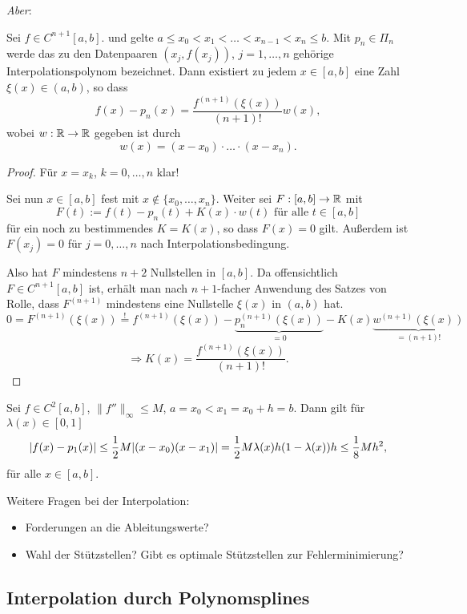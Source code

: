 \emph{Aber}:

\begin{thm}[Interpolationsfehler]
 Sei $f \in C^{n+1}[a,b]$. und gelte $a \le x_0 < x_1 < \ldots < x_{n-1} < x_n \le b$. Mit $p_n \in \Pi_n$ werde das zu den Datenpaaren $(x_j, f(x_j))$, $j=1, \ldots, n$ gehörige Interpolationspolynom bezeichnet. Dann existiert zu jedem $x \in [a,b]$ eine Zahl $\xi(x) \in (a,b)$, so dass
 \[ f(x) - p_n(x) = \frac{f^{(n+1)}(\xi(x))}{(n+1)!} w(x), \]
 wobei $w : \mathbb{R} \to \mathbb{R}$ gegeben ist durch
 \[ w(x) = (x-x_0) \cdot \ldots \cdot (x-x_n). \]
\end{thm}

\begin{proof}
 Für $x=x_k$, $k =0, \ldots, n$ klar!
 
 Sei nun $x \in [a,b]$ fest mit $x \notin \{ x_0, \ldots, x_n \}$. Weiter sei $F:[a,b] \to \mathbb{R}$ mit
 \[ F(t) := f(t) - p_n(t) + K(x) \cdot w(t) \text{ für alle } t \in [a,b] \]
 für ein noch zu bestimmendes $K = K(x)$, so dass $F(x) = 0$ gilt. Außerdem ist $F(x_j) = 0$ für $j = 0, \ldots, n$ nach Interpolationsbedingung.
 
 Also hat $F$ mindestens $n+2$ Nullstellen in $[a,b]$. Da offensichtlich $F \in C^{n+1}[a,b]$ ist, erhält man nach $n+1$-facher Anwendung des Satzes von Rolle, dass $F^{(n+1)}$ mindestens eine Nullstelle $\xi(x)$ in $(a,b)$ hat.
 \[ 0 = F^{(n+1)}(\xi(x)) \overset{!}{=} f^{(n+1)}(\xi(x)) - \underbrace{p_n^{(n+1)}(\xi(x))}_{=0} - K(x) \underbrace{w^{(n+1)}(\xi(x))}_{=(n+1)!} \]
 \[ \Rightarrow K(x) = \frac{f^{(n+1)}(\xi(x))}{(n+1)!}. \]
\end{proof}

\begin{exmp}
 Sei $f \in C^2[a,b]$, $\| f'' \|_\infty \le M$, $a = x_0 < x_1 = x_0 + h = b$. Dann gilt für $\lambda(x) \in [0,1]$
 \[ | f(x) - p_1(x) | \le \frac{1}{2} M | (x-x_0)(x-x_1) | = \frac{1}{2} M \lambda(x) h (1-\lambda(x)) h \le \frac{1}{8} M h^2, \]
 für alle $x \in [a,b]$.
\end{exmp}

Weitere Fragen bei der Interpolation:
\begin{itemize}
 \item Forderungen an die Ableitungswerte?
 \item Wahl der Stützstellen? Gibt es optimale Stützstellen zur Fehlerminimierung?
\end{itemize}

\subsection{Interpolation durch Polynomsplines}
